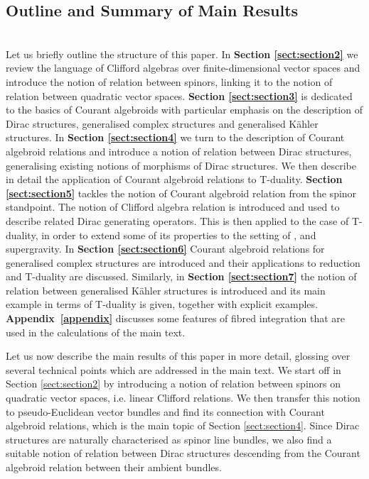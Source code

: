 \documentclass[a4paper, reqno, 11pt]{amsart}
\numberwithin{equation}{section}
\theoremstyle{definition}
\theoremstyle{remark}
\begin{document}
\subsection{Outline and Summary of Main Results}~\\[5pt]
Let us briefly outline the structure of this paper. In \textbf{Section \ref{sect:section2}} we review the language of Clifford algebras over finite-dimensional vector spaces and introduce the notion of relation between spinors,  linking it to the notion of relation between quadratic vector spaces. \textbf{Section \ref{sect:section3}} is dedicated to the basics of Courant algebroids with particular emphasis on the description of Dirac structures, generalised complex structures and generalised K{\"a}hler structures. In \textbf{Section \ref{sect:section4}} we turn to the description of Courant algebroid relations and introduce a notion of relation between Dirac structures, generalising existing notions of morphisms of Dirac structures. We then describe in detail the application of Courant algebroid relations to T-duality. 
\textbf{Section \ref{sect:section5}} tackles the notion of Courant algebroid relation from the spinor standpoint. The notion of Clifford algebra relation is introduced and used to describe related Dirac generating operators. This is then applied to the case of T-duality, in order to extend some of its properties to the setting of \cite{DeFraja:2023fhe}, and supergravity. In \textbf{Section \ref{sect:section6}} Courant algebroid relations for generalised complex structures are introduced and their applications to reduction and T-duality are discussed. Similarly, in \textbf{Section \ref{sect:section7}} the notion of relation between generalised K{\"a}hler structures is introduced and its main example in terms of T-duality is given, together with explicit examples. \textbf{Appendix~\ref{appendix}} discusses some features of fibred integration that are used in the calculations of the main text.

Let us now describe the main results of this paper in more detail, glossing over several technical points which are addressed in the main text.
We start off in {Section \ref{sect:section2}} by introducing a notion of relation between spinors on quadratic vector spaces, i.e. linear Clifford relations. 
We then transfer this notion to pseudo-Euclidean vector bundles and find its connection with Courant algebroid relations, which is the main topic of {Section \ref{sect:section4}}. Since Dirac structures are naturally characterised as spinor line bundles, we also find a suitable notion of relation between Dirac structures descending from the Courant algebroid relation between their ambient bundles.  
\end{document}
